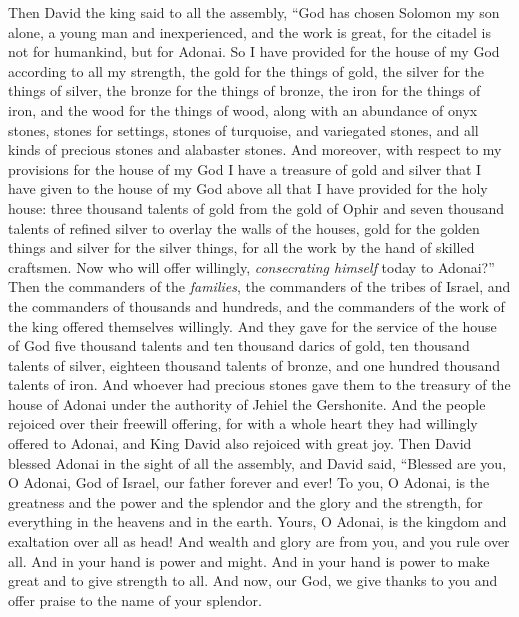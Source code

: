 \begin{biblechapter} %
 Then David the king said to all the assembly, “God has chosen Solomon my son alone, a young man and inexperienced, and the work is great, for the citadel is not for humankind, but for Adonai.
\verse So I have provided for the house of my God according to all my strength, the gold for the things of gold, the silver for the things of silver, the bronze for the things of bronze, the iron for the things of iron, and the wood for the things of wood, along with an abundance of onyx stones, stones for settings, stones of turquoise, and variegated stones, and all kinds of precious stones and alabaster stones.
\verse And moreover, with respect to my provisions for the house of my God I have a treasure of gold and silver that I have given to the house of my God above all that I have provided for the holy house:
\verse three thousand talents of gold from the gold of Ophir and seven thousand talents of refined silver to overlay the walls of the houses,
\verse gold for the golden things and silver for the silver things, for all the work by the hand of skilled craftsmen. Now who will offer willingly, \textit{consecrating himself} today to Adonai?”
\verse Then the commanders of the \textit{families}, the commanders of the tribes of Israel, and the commanders of thousands and hundreds, and the commanders of the work of the king offered themselves willingly.
\verse And they gave for the service of the house of God five thousand talents and ten thousand darics of gold, ten thousand talents of silver, eighteen thousand talents of bronze, and one hundred thousand talents of iron.
\verse And whoever had precious stones gave them to the treasury of the house of Adonai under the authority of Jehiel the Gershonite.
\verse And the people rejoiced over their freewill offering, for with a whole heart they had willingly offered to Adonai, and King David also rejoiced with great joy.
\verse Then David blessed Adonai in the sight of all the assembly, and David said, “Blessed are you, O Adonai, God of Israel, our father forever and ever!
\verse To you, O Adonai, is the greatness and the power and the splendor and the glory and the strength, for everything in the heavens and in the earth. Yours, O Adonai, is the kingdom and exaltation over all as head!
\verse And wealth and glory are from you, and you rule over all. And in your hand is power and might. And in your hand is power to make great and to give strength to all.
\verse And now, our God, we give thanks to you and offer praise to the name of your splendor.

\end{biblechapter}
